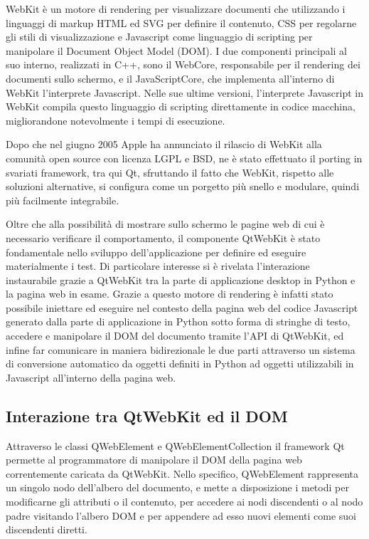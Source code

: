 \documentclass[12pt]{toptesi}
\begin{document}
WebKit è un motore di rendering per visualizzare documenti che utilizzando i linguaggi di markup HTML ed SVG per definire il contenuto, CSS per regolarne gli stili di visualizzazione e Javascript come linguaggio di scripting per manipolare il Document Object Model (DOM). I due componenti principali al suo interno, realizzati in C++, sono il WebCore, responsabile per il rendering dei documenti sullo schermo, e il JavaScriptCore, che implementa all'interno di WebKit l'interprete Javascript. Nelle sue ultime versioni, l'interprete Javascript in WebKit compila questo linguaggio di scripting direttamente in codice macchina, migliorandone notevolmente i tempi di esecuzione.

Dopo che nel giugno 2005 Apple ha annunciato il rilascio di WebKit alla comunità open source con licenza LGPL e BSD, ne è stato effettuato il porting in svariati framework, tra qui Qt, sfruttando il fatto che WebKit, rispetto alle soluzioni alternative, si configura come un porgetto più snello e modulare, quindi più facilmente integrabile.

Oltre che alla possibilità di mostrare sullo schermo le pagine web di cui è necessario verificare il comportamento, il componente QtWebKit è stato fondamentale nello sviluppo dell'applicazione per definire ed eseguire materialmente i test. Di particolare interesse si è rivelata l'interazione instaurabile grazie a QtWebKit tra la parte di applicazione desktop in Python e la pagina web in esame. Grazie a questo motore di rendering è infatti stato possibile iniettare ed eseguire nel contesto della pagina web del codice Javascript generato dalla parte di applicazione in Python sotto forma di stringhe di testo, accedere e manipolare il DOM del documento tramite l'API di QtWebKit, ed infine far comunicare in maniera bidirezionale le due parti attraverso un sistema di conversione automatico da oggetti definiti in Python ad oggetti utilizzabili in Javascript all'interno della pagina web.

\subsection{Interazione tra QtWebKit ed il DOM}

Attraverso le classi QWebElement e QWebElementCollection il framework Qt permette al programmatore di manipolare il DOM della pagina web correntemente caricata da QtWebKit. Nello specifico, QWebElement rappresenta un singolo nodo dell'albero del documento, e mette a disposizione i metodi per modificarne gli attributi o il contenuto, per accedere ai nodi discendenti o al nodo padre visitando l'albero DOM e per appendere ad esso nuovi elementi come suoi discendenti diretti.
\end{document}
